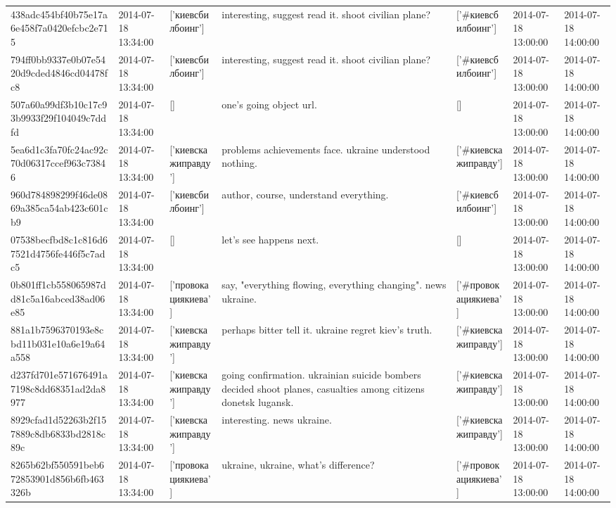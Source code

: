 \begin{tabular}{lllllll}
438adc454bf40b75e17a6e458f7a0420efcbc2e715 & 2014-07-18 13:34:00 & ['киевсбилбоинг'] & interesting, suggest read it. shoot civilian plane? & ['#киевсбилбоинг'] & 2014-07-18 13:00:00 & 2014-07-18 14:00:00 \\
794ff0bb9337e0b07e5420d9cded4846cd04478fc8 & 2014-07-18 13:34:00 & ['киевсбилбоинг'] & interesting, suggest read it. shoot civilian plane? & ['#киевсбилбоинг'] & 2014-07-18 13:00:00 & 2014-07-18 14:00:00 \\
507a60a99df3b10c17c93b9933f29f104049c7ddfd & 2014-07-18 13:34:00 & [] & one's going object url. & [] & 2014-07-18 13:00:00 & 2014-07-18 14:00:00 \\
5ea6d1c3fa70fc24ac92c70d06317ccef963c73846 & 2014-07-18 13:34:00 & ['киевскажиправду'] & problems achievements face. ukraine understood nothing. & ['#киевскажиправду'] & 2014-07-18 13:00:00 & 2014-07-18 14:00:00 \\
960d784898299f46de0869a385ca54ab423c601cb9 & 2014-07-18 13:34:00 & ['киевсбилбоинг'] & author, course, understand everything. & ['#киевсбилбоинг'] & 2014-07-18 13:00:00 & 2014-07-18 14:00:00 \\
07538becfbd8c1c816d67521d4756fe446f5c7adc5 & 2014-07-18 13:34:00 & [] & let's see happens next. & [] & 2014-07-18 13:00:00 & 2014-07-18 14:00:00 \\
0b801ff1cb558065987dd81c5a16abced38ad06e85 & 2014-07-18 13:34:00 & ['провокациякиева'] & say, "everything flowing, everything changing". news ukraine. & ['#провокациякиева'] & 2014-07-18 13:00:00 & 2014-07-18 14:00:00 \\
881a1b7596370193e8cbd11b031e10a6e19a64a558 & 2014-07-18 13:34:00 & ['киевскажиправду'] & perhaps bitter tell it. ukraine regret kiev's truth. & ['#киевскажиправду'] & 2014-07-18 13:00:00 & 2014-07-18 14:00:00 \\
d237fd701e571676491a7198c8dd68351ad2da8977 & 2014-07-18 13:34:00 & ['киевскажиправду'] & going confirmation. ukrainian suicide bombers decided shoot planes, casualties among citizens donetsk lugansk. & ['#киевскажиправду'] & 2014-07-18 13:00:00 & 2014-07-18 14:00:00 \\
8929cfad1d52263b2f157889c8db6833bd2818c89c & 2014-07-18 13:34:00 & ['киевскажиправду'] & interesting. news ukraine. & ['#киевскажиправду'] & 2014-07-18 13:00:00 & 2014-07-18 14:00:00 \\
8265b62bf550591beb672853901d856b6fb463326b & 2014-07-18 13:34:00 & ['провокациякиева'] & ukraine, ukraine, what's difference? & ['#провокациякиева'] & 2014-07-18 13:00:00 & 2014-07-18 14:00:00 \\

\end{tabular}

